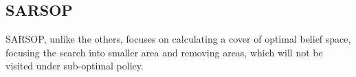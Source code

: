 \subsection{SARSOP \cite{sarsop}}
SARSOP, unlike the others, focuses on calculating a cover of optimal belief space, focusing the search into smaller area and removing areas, which will not be visited under sub-optimal policy.


